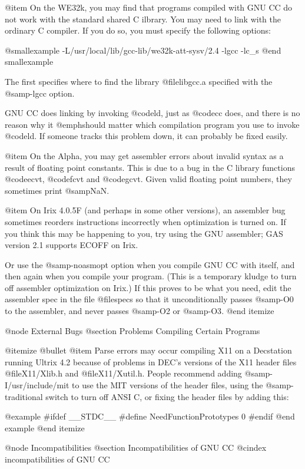 @item
On the WE32k, you may find that programs compiled with GNU CC do not
work with the standard shared C ilbrary.  You may need to link with
the ordinary C compiler.  If you do so, you must specify the following
options:

@smallexample
-L/usr/local/lib/gcc-lib/we32k-att-sysv/2.4 -lgcc -lc_s
@end smallexample

The first specifies where to find the library @file{libgcc.a}
specified with the @samp{-lgcc} option.

GNU CC does linking by invoking @code{ld}, just as @code{cc} does, and
there is no reason why it @emph{should} matter which compilation program
you use to invoke @code{ld}.  If someone tracks this problem down,
it can probably be fixed easily.

@item
On the Alpha, you may get assembler errors about invalid syntax as a
result of floating point constants.  This is due to a bug in the C
library functions @code{ecvt}, @code{fcvt} and @code{gcvt}.  Given valid
floating point numbers, they sometimes print @samp{NaN}.

@item
On Irix 4.0.5F (and perhaps in some other versions), an assembler bug
sometimes reorders instructions incorrectly when optimization is turned
on.  If you think this may be happening to you, try using the GNU
assembler; GAS version 2.1 supports ECOFF on Irix.

Or use the @samp{-noasmopt} option when you compile GNU CC with itself,
and then again when you compile your program.  (This is a temporary
kludge to turn off assembler optimization on Irix.)  If this proves to
be what you need, edit the assembler spec in the file @file{specs} so
that it unconditionally passes @samp{-O0} to the assembler, and never
passes @samp{-O2} or @samp{-O3}.
@end itemize

@node External Bugs
@section Problems Compiling Certain Programs

@itemize @bullet
@item
Parse errors may occur compiling X11 on a Decstation running Ultrix 4.2
because of problems in DEC's versions of the X11 header files
@file{X11/Xlib.h} and @file{X11/Xutil.h}.  People recommend adding
@samp{-I/usr/include/mit} to use the MIT versions of the header files,
using the @samp{-traditional} switch to turn off ANSI C, or fixing the
header files by adding this:

@example
#ifdef __STDC__
#define NeedFunctionPrototypes 0
#endif
@end example
@end itemize

@node Incompatibilities
@section Incompatibilities of GNU CC
@cindex incompatibilities of GNU CC

